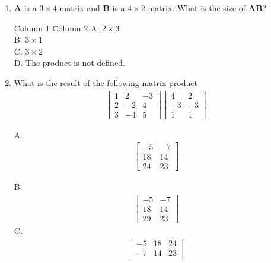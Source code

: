 \begin{enumerate}
\item $\mathbf{A}$ is a $3 \times 4$ matrix and $\mathbf{B}$ is a $4\times 2$ matrix. What is the size of $\mathbf{A} \mathbf{B}$?
\begin{tabbing}
  Column 1 \= Column 2 \kill
  A. $ 2 \times 3$   \\
  B. $3\times 1$ \\
  C. $3 \times 2$ \\
  D.  The product is not defined.
\end{tabbing}
\item What is the result of the following matrix product
\begin{align*}
\begin{bmatrix}
1 & 2 & -3 \\
2 & -2 & 4 \\ 3 & -4 & 5
\end{bmatrix}
\begin{bmatrix}
 4 & 2 \\-3 & -3 \\ 1  & 1
\end{bmatrix}
\end{align*}

  A. \vspace{-2em}\begin{align*}
  \begin{bmatrix}
   -5 &   -7 \\
    18  &  14 \\
    24  &  23
    \end{bmatrix}
    \end{align*}

  B. \vspace{-2em}\begin{align*}
  \begin{bmatrix}
   -5 &   -7 \\
    18  &  14 \\
    29  &  23
    \end{bmatrix}
    \end{align*}
  C.\vspace{-2em} \begin{align*}
  \begin{bmatrix}
   -5 &  18 & 24 \\
   -7 & 14 & 23
    \end{bmatrix}
    \end{align*}


\end{enumerate}
